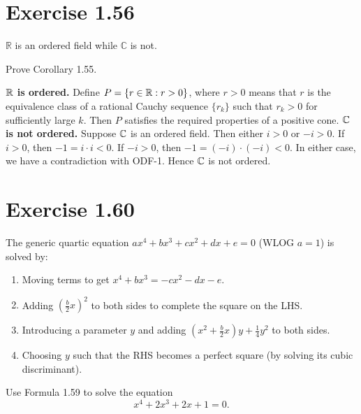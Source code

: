 \documentclass{article}
\begin{document}
\section{Exercise 1.56}

\begin{corollary}[Corollary 1.55]
  $\mathbb{R}$ is an ordered field while $\mathbb{C}$ is not.
\end{corollary}

Prove Corollary 1.55.

\begin{solution}
  \textbf{$\mathbb{R}$ is ordered.} Define $P = \{r \in \mathbb{R} : r > 0\}$, where
  $r > 0$ means that $r$ is the equivalence class of a rational
  Cauchy sequence $\{r_k\}$ such that $r_k > 0$ for sufficiently
  large $k$. Then $P$ satisfies the required properties of a positive
  cone.
  \textbf{$\mathbb{C}$ is not ordered.} Suppose $\mathbb{C}$ is an ordered field. Then
  either $i > 0$ or $-i > 0$. If $i > 0$, then $-1 = i \cdot i < 0$.
  If $-i > 0$, then $-1 = (-i) \cdot (-i) < 0$. In either case, we
  have a contradiction with ODF-1. Hence $\mathbb{C}$ is not ordered.
\end{solution}

\section{Exercise 1.60}

\begin{remark}
  The generic quartic equation $ax^4 + bx^3 + cx^2 + dx + e = 0$
  (WLOG $a=1$) is solved by:
  \begin{enumerate}
    \item Moving terms to get $x^4 + bx^3 = -cx^2 - dx - e$.
    \item Adding $(\frac{b}{2}x)^2$ to both sides to complete the
      square on the LHS.
    \item Introducing a parameter $y$ and adding $(x^2 +
      \frac{b}{2}x)y + \frac{1}{4}y^2$ to both sides.
    \item Choosing $y$ such that the RHS becomes a perfect square (by
      solving its cubic discriminant).
  \end{enumerate}
\end{remark}

Use Formula 1.59 to solve the equation
\[
  x^4 + 2x^3 + 2x + 1 = 0.
\]
\end{document}
